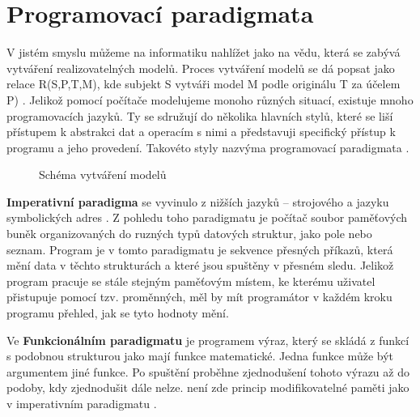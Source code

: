 \documentclass[FP,DP]{tulthesis}
\begin{document}
\section{Programovací paradigmata}
V jistém smyslu můžeme na informatiku nahlížet jako na vědu, která se zabývá vytváření realizovatelných modelů. Proces vytváření modelů se dá popsat jako relace R(S,P,T,M), kde subjekt S vytváři model M podle originálu T za účelem P) \citep*[s.~135]{didaktikderinformatik}. Jelikož pomocí počítače modelujeme monoho různých situací, existuje mnoho programovacích jazyků. Ty se sdružují do několika hlavních stylů, které se liší přístupem k abstrakci dat a operacím s nimi a představuji specifický přístup k programu a jeho provedení. Takovéto styly nazvýma programovací paradigmata \citep*[s.~286]{bolshakova}.
\begin{figure}[h!]
\centering
{}

\caption{Schéma vytváření modelů \citep*[s.~135]{didaktikderinformatik}} \label{modely}
\end{figure}

\textbf{Imperativní paradigma} se vyvinulo z nižších jazyků -- strojového a jazyku symbolických adres \citep*[s.~286]{bolshakova}. Z pohledu toho paradigmatu je počítač soubor paměťových buněk organizovaných  do ruzných typů datových struktur, jako pole nebo seznam.  Program je v tomto paradigmatu je sekvence přesných příkazů, která mění data v těchto strukturách a které jsou spuštěny v přesném sledu. Jelikož program pracuje se stále stejným paměťovým místem, ke kterému uživatel přistupuje pomocí tzv. proměnných, měl by mít programátor v každém kroku programu přehled, jak se tyto hodnoty mění. 

Ve \textbf{Funkcionálním paradigmatu}
je programem výraz, který se skládá z funkcí s podobnou strukturou jako mají funkce matematické. Jedna funkce může být argumentem jiné funkce. Po spuštění proběhne zjednodušení tohoto výrazu až do podoby, kdy zjednodušit dále nelze.  není zde princip modifikovatelné paměti jako v imperativním paradigmatu \citep*{skavrda}. 
\end{document}
